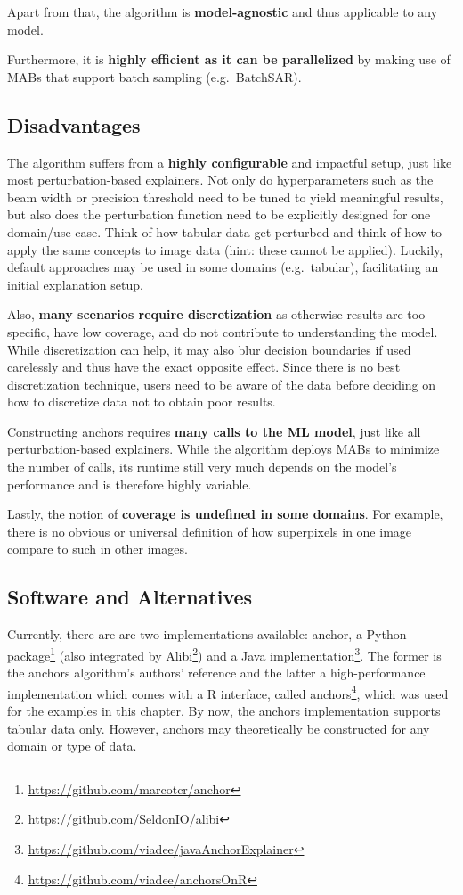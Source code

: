 \documentclass[
  10pt,
]{scrbook}
\renewcommand{\href}[2]{#2\footnote{\url{#1}}}
\begin{document}
Apart from that, the algorithm is \textbf{model-agnostic} and thus applicable to any model.

Furthermore, it is \textbf{highly efficient as it can be parallelized} by making use of MABs that support batch sampling (e.g.~BatchSAR).

\hypertarget{disadvantages-15}{%
\subsection{Disadvantages}\label{disadvantages-15}}

The algorithm suffers from a \textbf{highly configurable} and impactful setup, just like most perturbation-based explainers.
Not only do hyperparameters such as the beam width or precision threshold need to be tuned to yield meaningful results, but also does the perturbation function need to be explicitly designed for one domain/use case.
Think of how tabular data get perturbed and think of how to apply the same concepts to image data (hint: these cannot be applied).
Luckily, default approaches may be used in some domains (e.g.~tabular), facilitating an initial explanation setup.

Also, \textbf{many scenarios require discretization} as otherwise results are too specific, have low coverage, and do not contribute to understanding the model. While discretization can help, it may also blur decision boundaries if used carelessly and thus have the exact opposite effect. Since there is no best discretization technique, users need to be aware of the data before deciding on how to discretize data not to obtain poor results.

Constructing anchors requires \textbf{many calls to the ML model}, just like all perturbation-based explainers. While the algorithm deploys MABs to minimize the number of calls, its runtime still very much depends on the model's performance and is therefore highly variable.

Lastly, the notion of \textbf{coverage is undefined in some domains}. For example, there is no obvious or universal definition of how superpixels in one image compare to such in other images.

\hypertarget{software-and-alternatives-3}{%
\subsection{Software and Alternatives}\label{software-and-alternatives-3}}

Currently, there are are two implementations available: \href{https://github.com/marcotcr/anchor}{anchor, a Python package} (also integrated by \href{https://github.com/SeldonIO/alibi}{Alibi}) and a \href{https://github.com/viadee/javaAnchorExplainer}{Java implementation}.
The former is the anchors algorithm's authors' reference and the latter a high-performance implementation which comes with a R interface, called \href{https://github.com/viadee/anchorsOnR}{anchors}, which was used for the examples in this chapter.
By now, the anchors implementation supports tabular data only.
However, anchors may theoretically be constructed for any domain or type of data.
\end{document}
